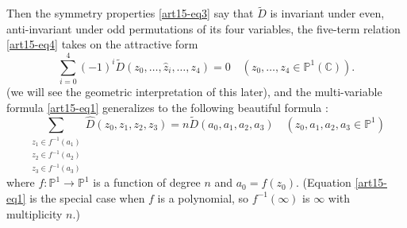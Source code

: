 Then the symmetry properties \eqref{art15-eq3} say that $\widetilde{D}$ is invariant under even, anti-invariant under odd permutations of its four variables, the five-term relation \eqref{art15-eq4} takes on the attractive form
\begin{equation}
\sum\limits^{4}_{i=0}(-1)^{i}\widetilde{D}(z_{0},\ldots,\widehat{z}_{i},\ldots,z_{4})=0\quad (z_{0},\ldots,z_{4}\in \mathbb{P}^{1}(\mathbb{C})).\label{art15-eq6}
\end{equation}
(we will see the geometric interpretation of this later), and the multi-variable formula \eqref{art15-eq1} generalizes to the following beautiful formula :
$$
\sum\limits_{\substack{z_{1}\in f^{-1}(a_{1})\\ z_{2}\in f^{-1}(a_{2})\\ z_{3}\in f^{-1}(a_{3})}}\widehat{D}(z_{0},z_{1},z_{2},z_{3})=n\widetilde{D}(a_{0},a_{1},a_{2},a_{3})\quad (z_{0},a_{1},a_{2},a_{3}\in \mathbb{P}^{1})
$$\pageoriginale
where $f:\mathbb{P}^{1}\to \mathbb{P}^{1}$ is a function of degree $n$ and $a_{0}=f(z_{0})$. (Equation \eqref{art15-eq1} is the special case when $f$ is a polynomial, so $f^{-1}(\infty)$ is $\infty$ with multiplicity $n$.)


